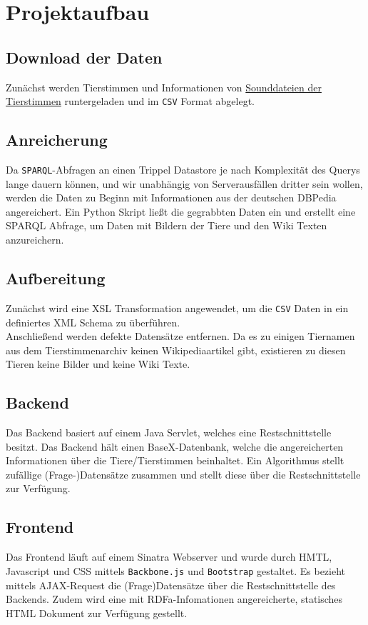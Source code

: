 \documentclass[a4paper,10pt]{article}
\begin{document}
\section{Projektaufbau}
        \subsection{Download der Daten}
        Zunächst werden Tierstimmen und Informationen von \href{http://offene-naturfuehrer.de/web/Open_Source_Tierstimmen}{Sounddateien der Tierstimmen} runtergeladen und im \texttt{CSV} Format abgelegt.
        
        \subsection{Anreicherung}
            Da \texttt{SPARQL}-Abfragen an einen Trippel Datastore je nach Komplexität des Querys 
            lange dauern können, und wir unabhängig von Serverausfällen dritter 
            sein wollen, werden die Daten zu Beginn mit Informationen
            aus der deutschen DBPedia angereichert. Ein Python Skript ließt 
            die gegrabbten Daten ein und erstellt eine SPARQL Abfrage, um Daten mit Bildern
            der Tiere und den Wiki Texten anzureichern.
            
       \subsection{Aufbereitung}
           Zunächst wird eine XSL Transformation angewendet, um die \texttt{CSV} Daten in
           ein definiertes XML Schema zu überführen.\\
           Anschließend werden defekte Datensätze entfernen. Da es zu einigen Tiernamen aus
           dem Tierstimmenarchiv keinen Wikipediaartikel gibt, existieren zu diesen
           Tieren keine Bilder und keine Wiki Texte.
           
       \subsection{Backend}
           Das Backend basiert auf einem Java Servlet, welches eine Restschnittstelle 
           besitzt. Das Backend hält einen BaseX-Datenbank, welche
           die angereicherten Informationen über die Tiere/Tierstimmen
           beinhaltet. Ein Algorithmus stellt zufällige (Frage-)Datensätze zusammen
           und stellt diese über die Restschnittstelle zur Verfügung.
           
       \subsection{Frontend}
           Das Frontend läuft auf einem Sinatra Webserver und wurde durch HMTL, Javascript und CSS mittels \texttt{Backbone.js} und \texttt{Bootstrap} gestaltet. Es bezieht mittels AJAX-Request die (Frage)Datensätze über die Restschnittstelle des Backends.
           Zudem wird eine mit RDFa-Infomationen angereicherte, statisches HTML Dokument
           zur Verfügung gestellt.
\end{document}
